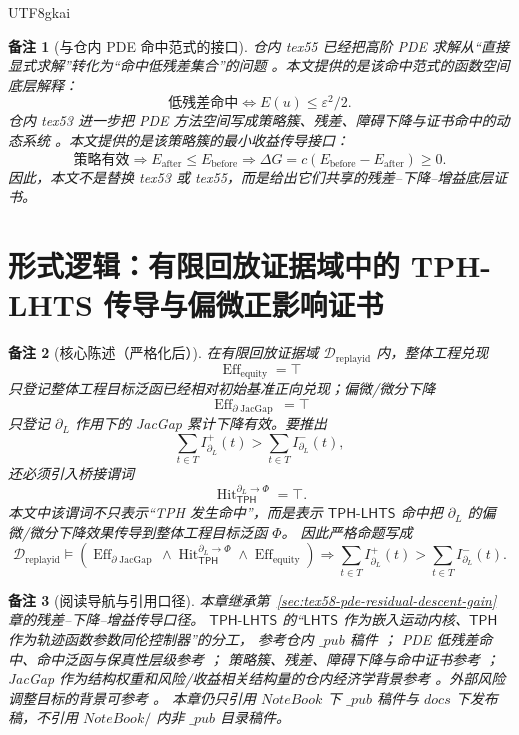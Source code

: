 \documentclass[12pt]{article}
\newtheorem{remark}{备注}[section]
\newcommand{\TPH}{\ensuremath{\mathsf{TPH}}}
\newcommand{\LHTS}{\ensuremath{\mathsf{LHTS}}}
\newcommand{\TPHLHTS}{\ensuremath{\mathsf{TPH\mbox{-}LHTS}}}
\DeclareMathOperator{\Eff}{Eff}
\DeclareMathOperator{\Hit}{Hit}
\DeclareMathOperator{\JacGap}{JacGap}
\begin{document}
\begin{CJK*}{UTF8}{gkai}
\begin{remark}[与仓内 PDE 命中范式的接口]
仓内 tex55 已经把高阶 PDE 求解从“直接显式求解”转化为“命中低残差集合”的问题
\cite{RepoTex55PDEParadigm}。本文提供的是该命中范式的函数空间底层解释：
\[
  \text{低残差命中}
  \Longleftrightarrow
  E(u)\le\varepsilon^2/2.
\]
仓内 tex53 进一步把 PDE 方法空间写成策略簇、残差、障碍下降与证书命中的动态系统
\cite{RepoTex53StrategyCluster}。本文提供的是该策略簇的最小收益传导接口：
\[
  \text{策略有效}
  \Longrightarrow
  E_{\mathrm{after}}\le E_{\mathrm{before}}
  \Longrightarrow
  \Delta G=c(E_{\mathrm{before}}-E_{\mathrm{after}})\ge0.
\]
因此，本文不是替换 tex53 或 tex55，而是给出它们共享的残差--下降--增益底层证书。
\end{remark}

\clearpage

\section{形式逻辑：有限回放证据域中的 TPH-LHTS 传导与偏微正影响证书}
\label{sec:tex58-tph-lhts-finite-replay-impact}

\begin{remark}[核心陈述（严格化后）]
在有限回放证据域 \(\mathcal D_{\mathrm{replayid}}\) 内，整体工程兑现
\[
  \Eff_{\mathrm{equity}}=\top
\]
只登记整体工程目标泛函已经相对初始基准正向兑现；偏微/微分下降
\[
  \Eff_{\partial\JacGap}=\top
\]
只登记 \(\partial_L\) 作用下的 JacGap 累计下降有效。要推出
\[
  \sum_{t\in T}I^+_{\partial_L}(t)
  >
  \sum_{t\in T}I^-_{\partial_L}(t),
\]
还必须引入桥接谓词
\[
  \Hit_{\TPH}^{\partial_L\to\Phi}=\top.
\]
本文中该谓词不只表示“TPH 发生命中”，而是表示 \TPHLHTS{} 命中把
\(\partial_L\) 的偏微/微分下降效果传导到整体工程目标泛函 \(\Phi\)。
因此严格命题写成
\[
  \boxed{
  \mathcal D_{\mathrm{replayid}}
  \models
  \left(
  \Eff_{\partial\JacGap}
  \wedge
  \Hit_{\TPH}^{\partial_L\to\Phi}
  \wedge
  \Eff_{\mathrm{equity}}
  \right)
  \Rightarrow
  \sum_{t\in T}I^+_{\partial_L}(t)
  >
  \sum_{t\in T}I^-_{\partial_L}(t).
  }
\]
\end{remark}

\begin{remark}[阅读导航与引用口径]
本章继承第~\ref{sec:tex58-pde-residual-descent-gain} 章的残差--下降--增益传导口径。
\TPHLHTS{} 的“\LHTS{} 作为嵌入运动内核、\TPH{} 作为轨迹函数参数同伦控制器”的分工，
参考仓内 \(\_pub\) 稿件 \cite{RepoTex56LHTS,RepoTex57TPHLHTS}；
PDE 低残差命中、命中泛函与保真性层级参考 \cite{RepoTex55PDEParadigm}；
策略簇、残差、障碍下降与命中证书参考 \cite{RepoTex53StrategyCluster}；
JacGap 作为结构权重和风险/收益相关结构量的仓内经济学背景参考
\cite{RepoEconomicsVol}。外部风险调整目标的背景可参考
\cite{Markowitz1952PortfolioSelection,RockafellarUryasev2000CVaR}。
本章仍只引用 \(NoteBook\) 下 \(\_pub\) 稿件与 \(docs\) 下发布稿，不引用 \(NoteBook/\) 内非 \(\_pub\) 目录稿件。
\end{remark}


\end{CJK*}
\end{document}
